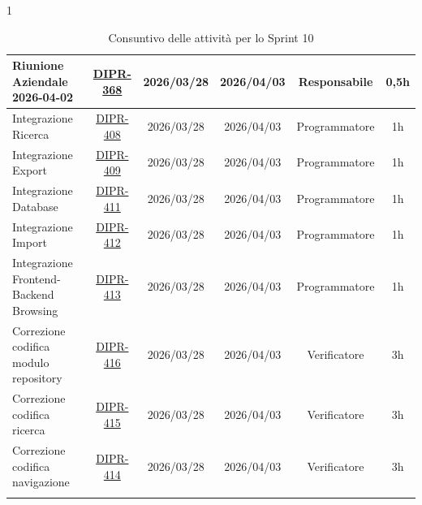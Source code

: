 \documentclass[a4paper,12pt]{article}
\begin{document}
\begin{spacing}{1}
\begin{longtable}{|p{4cm}|c|c|c|c|c|}
        \hline
        Riunione Aziendale 2026-04-02 & \href{https://7zpus.atlassian.net/browse/DIPR-368}{DIPR-368} & 2026/03/28 & 2026/04/03 & Responsabile & 0,5h \\
        \hline   
        Integrazione Ricerca & \href{https://7zpus.atlassian.net/browse/DIPR-408}{DIPR-408} & 2026/03/28 & 2026/04/03 & Programmatore & 1h \\
        \hline   
        Integrazione Export & \href{https://7zpus.atlassian.net/browse/DIPR-409}{DIPR-409} & 2026/03/28 & 2026/04/03 & Programmatore & 1h \\
        \hline   
        Integrazione Database & \href{https://7zpus.atlassian.net/browse/DIPR-411}{DIPR-411} & 2026/03/28 & 2026/04/03 & Programmatore & 1h \\
        \hline   
        Integrazione Import & \href{https://7zpus.atlassian.net/browse/DIPR-412}{DIPR-412} & 2026/03/28 & 2026/04/03 & Programmatore & 1h \\
        \hline   
        Integrazione Frontend-Backend Browsing & \href{https://7zpus.atlassian.net/browse/DIPR-413}{DIPR-413} & 2026/03/28 & 2026/04/03 & Programmatore & 1h \\
        \hline   
        Correzione codifica modulo repository & \href{https://7zpus.atlassian.net/browse/DIPR-416}{DIPR-416} & 2026/03/28 & 2026/04/03 & Verificatore & 3h \\
        \hline   
        Correzione codifica ricerca & \href{https://7zpus.atlassian.net/browse/DIPR-415}{DIPR-415} & 2026/03/28 & 2026/04/03 & Verificatore & 3h \\
        \hline   
        Correzione codifica navigazione & \href{https://7zpus.atlassian.net/browse/DIPR-414}{DIPR-414} & 2026/03/28 & 2026/04/03 & Verificatore & 3h \\
        \hline
        \rowcolor{white}
        \caption{Consuntivo delle attività per lo Sprint 10}
    \end{longtable}
    \end{spacing}
\end{document}

